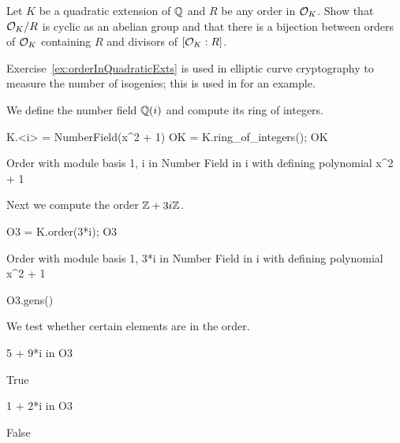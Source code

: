 \begin{exercise}\label{ex:orderInQuadraticExts}
	Let $K$ be a quadratic extension of $\mathbb{Q}$
	and $R$ be any order in $\mathcal{O}_K$.
	Show that $\mathcal{O}_K/R$ is cyclic as an abelian group
	and that there is a bijection between orders of
	$\mathcal{O}_K$ containing $R$ and divisors of $[\mathcal{O}_K:R]$.
\end{exercise}

\begin{remark}
	Exercise~\ref{ex:orderInQuadraticExts} is used in
	elliptic curve cryptography to measure the number
	of isogenies; this is used in \cite[\S11.2]{Koblitz2011781}
	for an example.
\end{remark}

We define the number field $\mathbb{Q}(i)$ and compute its
ring of integers.
\begin{sagecode}
\begin{sagecell}
K.<i> = NumberField(x^2 + 1)
OK = K.ring_of_integers(); OK
\end{sagecell}
\begin{sageout}
Order with module basis 1, i in Number Field in i with
defining polynomial x^2 + 1
\end{sageout}
\end{sagecode}

\noindent Next we compute the order $\mathbb{Z} + 3i \mathbb{Z}$.
\begin{sagecode}
\begin{sagecell}
O3 = K.order(3*i); O3
\end{sagecell}
\begin{sageout}
Order with module basis 1, 3*i in Number Field in i with
defining polynomial x^2 + 1
\end{sageout}
\begin{sagecell}
O3.gens()
\end{sagecell}
\begin{sageout}
[1, 3*i]
\end{sageout}
\end{sagecode}


\noindent We test whether certain elements are in the order.
\begin{sagecode}
\begin{sagecell}
5 + 9*i in O3
\end{sagecell}
\begin{sageout}
True
\end{sageout}
\begin{sagecell}
1 + 2*i in O3
\end{sagecell}
\begin{sageout}
False
\end{sageout}
\end{sagecode}


